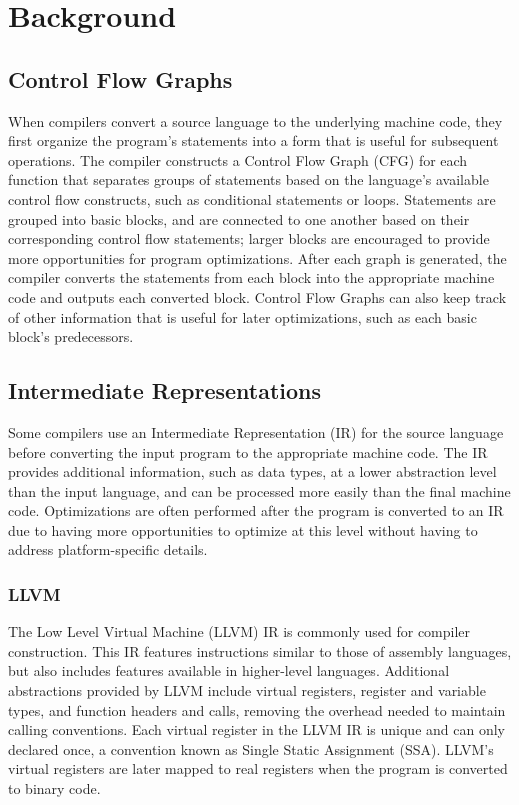 \chapter{Background}

\section{Control Flow Graphs}
When compilers convert a source language to the underlying machine code, they first organize the program's statements into a form that is useful for subsequent operations. The compiler constructs a Control Flow Graph (CFG) for each function that separates groups of statements based on the language's available control flow constructs, such as conditional statements or loops. Statements are grouped into basic blocks, and are connected to one another based on their corresponding control flow statements; larger blocks are encouraged to provide more opportunities for program optimizations. After each graph is generated, the compiler converts the statements from each block into the appropriate machine code and outputs each converted block. Control Flow Graphs can also keep track of other information that is useful for later optimizations, such as each basic block's predecessors.

\section{Intermediate Representations}
Some compilers use an Intermediate Representation (IR) for the source language before converting the input program to the appropriate machine code. The IR provides additional information, such as data types, at a lower abstraction level than the input language, and can be processed more easily than the final machine code. Optimizations are often performed after the program is converted to an IR due to having more opportunities to optimize at this level without having to address platform-specific details.

\subsection{LLVM}
The Low Level Virtual Machine (LLVM) IR is commonly used for compiler construction. This IR features instructions similar to those of assembly languages, but also includes features available in higher-level languages. Additional abstractions provided by LLVM include virtual registers, register and variable types, and function headers and calls, removing the overhead needed to maintain calling conventions. Each virtual register in the LLVM IR is unique and can only declared once, a convention known as Single Static Assignment (SSA). LLVM's virtual registers are later mapped to real registers when the program is converted to binary code.


